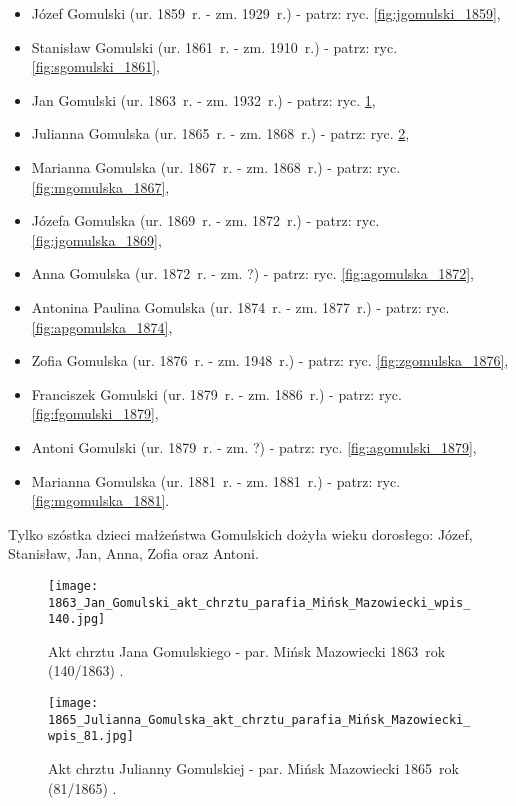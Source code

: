 \begin{itemize}
    \item Józef Gomulski (ur. 1859~r. - zm. 1929~r.) - patrz: ryc. 
    \ref{fig:jgomulski_1859},
    \item Stanisław Gomulski (ur. 1861~r. - zm. 1910~r.) - patrz: ryc. 
    \ref{fig:sgomulski_1861},
    \item Jan Gomulski (ur. 1863~r. - zm. 1932~r.) - patrz: ryc. 
    \ref{fig:jgomulski_1863},
    \item Julianna Gomulska (ur. 1865~r. - zm. 1868~r.) - patrz: ryc. 
    \ref{fig:jgomulska_1865},
    \item Marianna Gomulska (ur. 1867~r. - zm. 1868~r.) - patrz: ryc. 
    \ref{fig:mgomulska_1867},
    \item Józefa Gomulska (ur. 1869~r. - zm. 1872~r.) - patrz: ryc. 
    \ref{fig:jgomulska_1869},
    \item Anna Gomulska (ur. 1872~r. - zm. ?) - patrz: ryc. 
    \ref{fig:agomulska_1872},
    \item Antonina Paulina Gomulska (ur. 1874~r. - zm. 1877~r.) - patrz: ryc. 
    \ref{fig:apgomulska_1874},
    \item Zofia Gomulska (ur. 1876~r. - zm. 1948~r.) - patrz: ryc. 
    \ref{fig:zgomulska_1876},
    \item Franciszek Gomulski (ur. 1879~r. - zm. 1886~r.) - patrz: ryc. 
    \ref{fig:fgomulski_1879},
    \item Antoni Gomulski (ur. 1879~r. - zm. ?) - patrz: ryc. 
    \ref{fig:agomulski_1879},
    \item Marianna Gomulska (ur. 1881~r. - zm. 1881~r.) - patrz: ryc. 
    \ref{fig:mgomulska_1881}.
  \end{itemize}

Tylko szóstka dzieci małżeństwa Gomulskich dożyła wieku dorosłego: Józef,
Stanisław, Jan, Anna, Zofia oraz Antoni.

\begin{figure}[!ht]
    \vspace*{0.5cm}
    \centering \texttt{[image: 
        1863\_Jan\_Gomulski\_akt\_chrztu\_parafia\_Mińsk\_Mazowiecki\_wpis\_140.jpg]}
    \captionsetup{format=hang}
    \caption{Akt chrztu Jana Gomulskiego - par. Mińsk Mazowiecki 1863~rok (140/1863) 
    \cite{par_minsk2}.}
    \label{fig:jgomulski_1863}
\end{figure}

\begin{figure}[!ht]
    \vspace*{0.5cm}
    \centering \texttt{[image: 
        1865\_Julianna\_Gomulska\_akt\_chrztu\_parafia\_Mińsk\_Mazowiecki\_wpis\_81.jpg]}
    \captionsetup{format=hang}
    \caption{Akt chrztu Julianny Gomulskiej - par. Mińsk Mazowiecki 1865~rok (81/1865) 
    \cite{par_minsk2}.}
    \label{fig:jgomulska_1865}
\end{figure}


